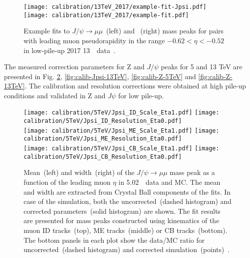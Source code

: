 	\begin{figure}[htb!]
		\begin{center}
			\texttt{[image: calibration/13TeV\_2017/example-fit-Jpsi.pdf]}
			\texttt{[image: calibration/13TeV\_2017/example-fit.pdf]}
			\caption{Example fits to $J/\psi \to \mu\mu$~(left) and \Zmm~(right) mass peaks for pairs with leading muon pseudorapidity in the range $-0.62<\eta<-0.52$ in low-pile-up 2017 13~\TeV\ data~\cite{int_note_muons}.}
			\label{fig:calib-fits}
		\end{center}
	\end{figure}

	The measured correction parameters for Z and $J/\psi$ peaks for 5 and 13 TeV are presented in Fig. \ref{fig:calib-Jpsi-5TeV}, \ref{fig:calib-Jpsi-13TeV}, \ref{fig:calib-Z-5TeV} and \ref{fig:calib-Z-13TeV}. The calibration and resolution corrections were obtained at high pile-up conditions and validated in Z and $J\psi$ for low pile-up.
	
	\begin{figure}[htb!]
		\begin{center}
			\texttt{[image: calibration/5TeV/Jpsi\_ID\_Scale\_Eta1.pdf]}
			\texttt{[image: calibration/5TeV/Jpsi\_ID\_Resolution\_Eta0.pdf]}\\
			\texttt{[image: calibration/5TeV/Jpsi\_ME\_Scale\_Eta1.pdf]}
			\texttt{[image: calibration/5TeV/Jpsi\_ME\_Resolution\_Eta0.pdf]}\\
			\texttt{[image: calibration/5TeV/Jpsi\_CB\_Scale\_Eta1.pdf]}
			\texttt{[image: calibration/5TeV/Jpsi\_CB\_Resolution\_Eta0.pdf]}
			\caption{Mean~(left) and width~(right) of the $J/\psi \to \mu\mu$ mass peak as a function of the leading muon $\eta$ in 5.02~\TeV\ data and MC. The mean and width are extracted from Crystal Ball components of the fits. In case of the simulation, both the uncorrected~(dashed histogram) and corrected parameters~(solid histogram) are shown. The fit results are presented for mass peaks constructed using kinematics of the muon ID tracks~(top), ME tracks~(middle) or CB tracks~(bottom). The bottom panels in each plot show the data/MC ratio for uncorrected~(dashed histogram) and corrected simulation~(points)~\cite{int_note_muons}.}
			\label{fig:calib-Jpsi-5TeV}
		\end{center}
	\end{figure}
	
